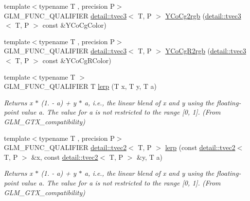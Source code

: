 \begin{DoxyCompactItemize}
\item 
{\footnotesize template$<$typename T , precision P$>$ }\\G\+L\+M\+\_\+\+F\+U\+N\+C\+\_\+\+Q\+U\+A\+L\+I\+F\+I\+ER \hyperlink{structglm_1_1detail_1_1tvec3}{detail\+::tvec3}$<$ T, P $>$ \hyperlink{group__gtx__color__space___y_co_cg_gab40e31e352d2d318d3f062df2882c500}{Y\+Co\+Cg2rgb} (\hyperlink{structglm_1_1detail_1_1tvec3}{detail\+::tvec3}$<$ T, P $>$ const \&Y\+Co\+Cg\+Color)
\item 
{\footnotesize template$<$typename T , precision P$>$ }\\G\+L\+M\+\_\+\+F\+U\+N\+C\+\_\+\+Q\+U\+A\+L\+I\+F\+I\+ER \hyperlink{structglm_1_1detail_1_1tvec3}{detail\+::tvec3}$<$ T, P $>$ \hyperlink{group__gtx__color__space___y_co_cg_ga7b90b9b5758dbe96a82a2ef8237a17e9}{Y\+Co\+Cg\+R2rgb} (\hyperlink{structglm_1_1detail_1_1tvec3}{detail\+::tvec3}$<$ T, P $>$ const \&Y\+Co\+Cg\+R\+Color)
\item 
{\footnotesize template$<$typename T $>$ }\\G\+L\+M\+\_\+\+F\+U\+N\+C\+\_\+\+Q\+U\+A\+L\+I\+F\+I\+ER T \hyperlink{group__gtx__compatibility_ga5494ba3a95ea6594c86fc75236886864}{lerp} (T x, T y, T a)
\begin{DoxyCompactList}\small\item\em Returns x $\ast$ (1. -\/ a) + y $\ast$ a, i.\+e., the linear blend of x and y using the floating-\/point value a. The value for a is not restricted to the range \mbox{[}0, 1\mbox{]}. (From G\+L\+M\+\_\+\+G\+T\+X\+\_\+compatibility) \end{DoxyCompactList}\item 
{\footnotesize template$<$typename T , precision P$>$ }\\G\+L\+M\+\_\+\+F\+U\+N\+C\+\_\+\+Q\+U\+A\+L\+I\+F\+I\+ER \hyperlink{structglm_1_1detail_1_1tvec2}{detail\+::tvec2}$<$ T, P $>$ \hyperlink{group__gtx__compatibility_gad97d71f29fcd1d51a1857a74b67490a0}{lerp} (const \hyperlink{structglm_1_1detail_1_1tvec2}{detail\+::tvec2}$<$ T, P $>$ \&x, const \hyperlink{structglm_1_1detail_1_1tvec2}{detail\+::tvec2}$<$ T, P $>$ \&y, T a)
\begin{DoxyCompactList}\small\item\em Returns x $\ast$ (1. -\/ a) + y $\ast$ a, i.\+e., the linear blend of x and y using the floating-\/point value a. The value for a is not restricted to the range \mbox{[}0, 1\mbox{]}. (From G\+L\+M\+\_\+\+G\+T\+X\+\_\+compatibility) \end{DoxyCompactList}\item 

\end{DoxyCompactItemize}
